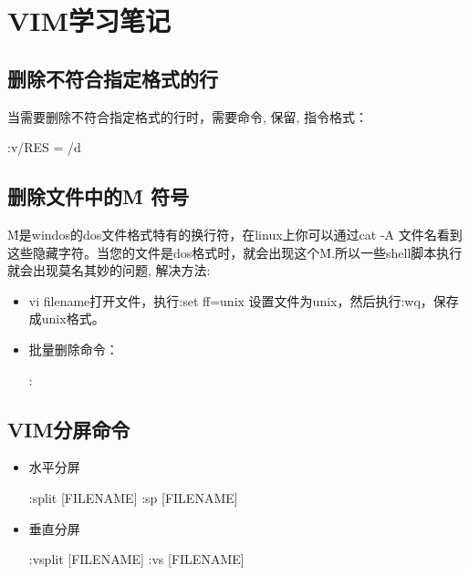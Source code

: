 \section{VIM学习笔记}

\subsection{删除不符合指定格式的行}
当需要删除不符合指定格式的行时，需要命令, 保留, 指令格式：
\begin{messagebox}
:v/RES = /d
\end{messagebox}

\subsection{删除文件中的\^M 符号}
\^M是windos的dos文件格式特有的换行符，在linux上你可以通过cat -A 文件名看到这些隐藏字符。当您的文件是dos格式时，就会出现这个\^M.所以一些shell脚本执行就会出现莫名其妙的问题, 解决方法:
\begin{itemize}
\item vi filename打开文件，执行:set ff=unix 设置文件为unix，然后执行:wq，保存成unix格式。
\item 批量删除命令：
\begin{messagebox}
:%
\end{messagebox}
\end{itemize}

\subsection{VIM分屏命令}
\begin{itemize}
\item 水平分屏
\begin{messagebox}
:split [FILENAME]
:sp [FILENAME]
\end{messagebox}
\item 垂直分屏
\begin{messagebox}
:vsplit [FILENAME]
:vs [FILENAME]
\end{messagebox}
\end{itemize}

